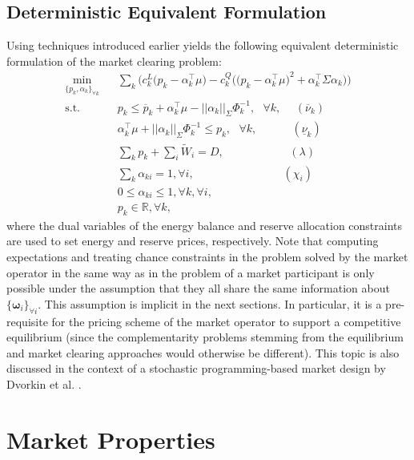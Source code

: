 \documentclass{article}
\begin{document}
\subsection{Deterministic Equivalent Formulation}
Using techniques introduced earlier yields the following equivalent deterministic formulation of the market clearing problem:
\begin{align}
\underset{\{p_k, \alpha_k\}_{\forall k}}{\min} \hspace{10pt} & \sum_k \Big(c_k^L\big(p_k - \alpha_k^\top \mu\big) - c_k^Q \Big(\big(p_k - \alpha_{k}^\top \mu \big)^2 + \alpha_k^\top \Sigma \alpha_k\Big)\Big)\\
\mbox{s.t. } & p_k \le \overline{p}_k + \alpha_k^\top \mu - ||\alpha_k||_{\Sigma} \Phi_k^{-1}, \mbox{ }\forall k, \hspace{15pt}(\overline{\nu}_k)\\
& \alpha_k^\top \mu + ||\alpha_k||_{\Sigma} \Phi_k^{-1} \le p_k, \mbox{ }\forall k, \hspace{37pt}(\underline{\nu}_k)\\
& \sum_k p_k + \sum_i \tilde{W}_i = D, \hspace{70pt} (\lambda)\\
& \sum_k \alpha_{ki} = 1, \forall i, \hspace{95pt} (\chi_i)\\
& 0 \le \alpha_{ki} \le 1, \forall k, \forall i,\\
& p_k \in \mathbb{R}, \forall k,
\end{align}
where the dual variables of the energy balance and reserve allocation constraints are used to set energy and reserve prices, respectively. Note that computing expectations and treating chance constraints in the problem solved by the market operator in the same way as in the problem of a market participant is only possible under the assumption that they all share the same information about $\{\boldsymbol{\omega}_i\}_{\forall i}$. This assumption is implicit in the next sections. In particular, it is a pre-requisite for the pricing scheme of the market operator to support a competitive equilibrium (since the complementarity problems stemming from the equilibrium and market clearing approaches would otherwise be different). This topic is also discussed in the context of a stochastic programming-based market design by Dvorkin et al. \cite{DvorkinV2019}.

\section{Market Properties}
\end{document}
